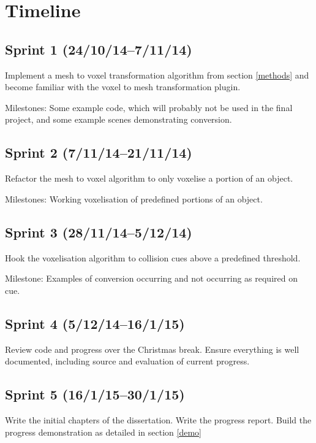 
\section{Timeline}

\subsection*{Sprint 1 (24/10/14--7/11/14)}

Implement a mesh to voxel transformation algorithm from section \ref{methods} and become familiar with the voxel to mesh transformation plugin.

Milestones: Some example code, which will probably not be
used in the final project, and some example scenes demonstrating conversion.


\subsection*{Sprint 2 (7/11/14--21/11/14)}

Refactor the mesh to voxel algorithm to only voxelise a portion of an object.

Milestones: Working voxelisation of predefined portions of an object.


\subsection*{Sprint 3 (28/11/14--5/12/14)}

Hook the voxelisation algorithm to collision cues above a predefined threshold.

Milestone: Examples of conversion occurring and not occurring as required on cue.


\subsection*{Sprint 4 (5/12/14--16/1/15)}

Review code and progress over the Christmas break. Ensure everything is well documented, including source and evaluation of current progress.


\subsection*{Sprint 5 (16/1/15--30/1/15)}

Write the initial chapters of the dissertation. Write the progress report. Build the progress demonstration as detailed in section \ref{demo}

